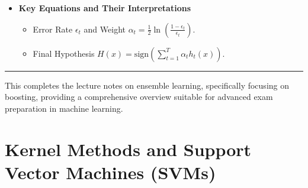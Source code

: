 \documentclass[
  12pt,
]{report}
\providecommand{\tightlist}{%
  \setlength{\itemsep}{0pt}\setlength{\parskip}{0pt}}
\begin{document}
\begin{enumerate}
\begin{itemize}
    \begin{itemize}
    \tightlist
    \item
      Derivation of \(\alpha_t\) and its impact on classifier weight.
    \end{itemize}
  \item
    \textbf{Key Equations and Their Interpretations}

    \begin{itemize}
    \tightlist
    \item
      Error Rate \(\epsilon_t\) and Weight \(\alpha_t = \frac{1}{2} \ln\left(\frac{1-\epsilon_t}{\epsilon_t}\right)\).
    \item
      Final Hypothesis \(H(x) = \text{sign}\left(\sum_{t=1}^T \alpha_t h_t(x)\right)\).
    \end{itemize}
  \end{itemize}
\end{enumerate}

\begin{center}\rule{0.5\linewidth}{0.5pt}\end{center}

This completes the lecture notes on ensemble learning, specifically focusing on boosting, providing a comprehensive overview suitable for advanced exam preparation in machine learning.

\chapter{Kernel Methods and Support Vector Machines (SVMs)}
\end{document}
